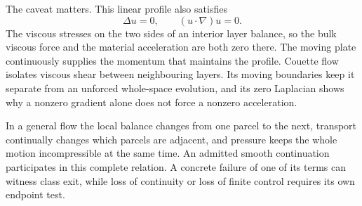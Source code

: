 The caveat matters.
This linear profile also satisfies
\[
  \Delta u=0,
  \qquad
  (u\cdot\nabla)u=0.
\]
The viscous stresses on the two sides of an interior layer balance, so the bulk viscous force and the material acceleration are both zero there.
The moving plate continuously supplies the momentum that maintains the profile.
Couette flow isolates viscous shear between neighbouring layers.
Its moving boundaries keep it separate from an unforced whole-space evolution, and its zero Laplacian shows why a nonzero gradient alone does not force a nonzero acceleration.

In a general flow the local balance changes from one parcel to the next, transport continually changes which parcels are adjacent, and pressure keeps the whole motion incompressible at the same time.
An admitted smooth continuation participates in this complete relation.
A concrete failure of one of its terms can witness class exit, while loss of continuity or loss of finite control requires its own endpoint test.
